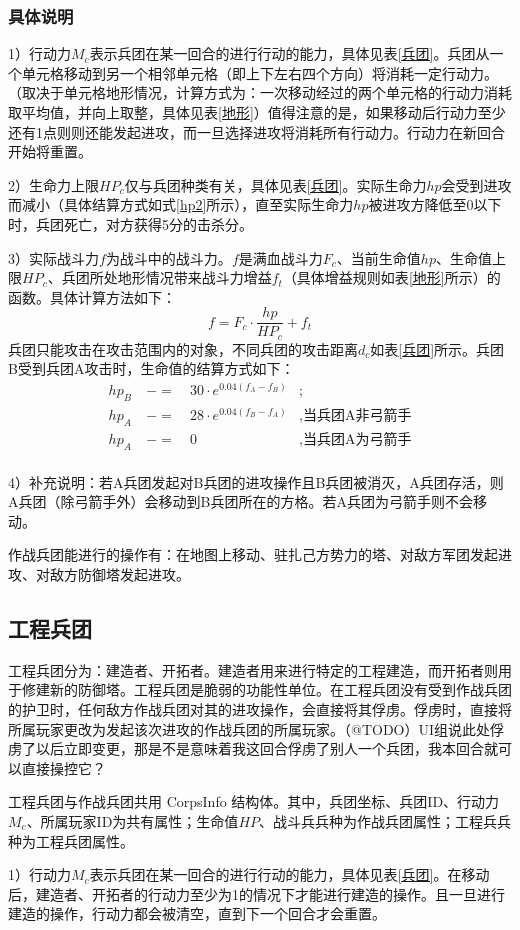 \documentclass[a4paper,4pt]{article}
\begin{document}
\subsubsection{具体说明}
1）行动力$M_c$表示兵团在某一回合的进行行动的能力，具体见表\ref{兵团}。兵团从一个单元格移动到另一个相邻单元格（即上下左右四个方向）将消耗一定行动力。（取决于单元格地形情况，计算方式为：一次移动经过的两个单元格的行动力消耗取平均值，并向上取整，具体见表\ref{地形}）值得注意的是，如果移动后行动力至少还有1点则则还能发起进攻，而一旦选择进攻将消耗所有行动力。行动力在新回合开始将重置。\par
2）生命力上限$HP_c$仅与兵团种类有关，具体见表\ref{兵团}。实际生命力$hp$会受到进攻而减小（具体结算方式如式\ref{hp2}所示），直至实际生命力$hp$被进攻方降低至0以下时，兵团死亡，对方获得5分的击杀分。\par
3）实际战斗力$f$为战斗中的战斗力。$f$是满血战斗力$F_c$、当前生命值$hp$、生命值上限$HP_c$、兵团所处地形情况带来战斗力增益$f_t$（具体增益规则如表\ref{地形}所示）的函数。具体计算方法如下：
\begin{equation}
	f = F_c \cdot \frac{hp}{HP_c} + f_t\label{f2}
\end{equation}
兵团只能攻击在攻击范围内的对象，不同兵团的攻击距离$d_c$如表\ref{兵团}所示。兵团B受到兵团A攻击时，生命值的结算方式如下：
\begin{equation}
	\begin{aligned}
		hp_{B} & \ -= & \ 30 \cdot e^{0.04(f_{A}-f_{B})} & ;                        \\
		hp_{A} & \ -= & \ 28 \cdot e^{0.04(f_{B}-f_{A})} & , \text{当兵团A非弓箭手} \\
		hp_{A} & \ -= & \ 0                              & , \text{当兵团A为弓箭手} \\
	\end{aligned}
	\label{hp2}
\end{equation}\par
4）补充说明：若A兵团发起对B兵团的进攻操作且B兵团被消灭，A兵团存活，则A兵团（除弓箭手外）会移动到B兵团所在的方格。若A兵团为弓箭手则不会移动。

作战兵团能进行的操作有：在地图上移动、驻扎己方势力的塔、对敌方军团发起进攻、对敌方防御塔发起进攻。


\subsection{工程兵团}
工程兵团分为：建造者、开拓者。建造者用来进行特定的工程建造，而开拓者则用于修建新的防御塔。工程兵团是脆弱的功能性单位。在工程兵团没有受到作战兵团的护卫时，任何敌方作战兵团对其的进攻操作，会直接将其俘虏。俘虏时，直接将所属玩家更改为发起该次进攻的作战兵团的所属玩家。（@TODO）UI组说此处俘虏了以后立即变更，那是不是意味着我这回合俘虏了别人一个兵团，我本回合就可以直接操控它？\par%
工程兵团与作战兵团共用 CorpsInfo 结构体。其中，兵团坐标、兵团ID、行动力$M_c$、所属玩家ID为共有属性；生命值$HP$、战斗兵兵种为作战兵团属性；工程兵兵种为工程兵团属性。\par
1）行动力$M_c$表示兵团在某一回合的进行行动的能力，具体见表\ref{兵团}。在移动后，建造者、开拓者的行动力至少为1的情况下才能进行建造的操作。且一旦进行建造的操作，行动力都会被清空，直到下一个回合才会重置。\par
\end{document}
